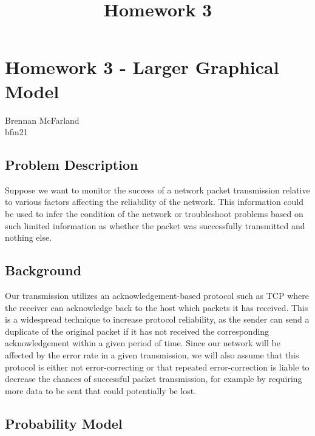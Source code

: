 \documentclass[11pt]{article}
\title{Homework 3}
\begin{document}
    
    
    \maketitle
    
    

    
    \hypertarget{homework-3---larger-graphical-model}{%
\section{Homework 3 - Larger Graphical
Model}\label{homework-3---larger-graphical-model}}

    Brennan McFarland\\
bfm21

    \hypertarget{problem-description}{%
\subsection{Problem Description}\label{problem-description}}

    Suppose we want to monitor the success of a network packet transmission
relative to various factors affecting the reliability of the network.
This information could be used to infer the condition of the network or
troubleshoot problems based on such limited information as whether the
packet was successfully transmitted and nothing else.

    \hypertarget{background}{%
\subsection{Background}\label{background}}

    Our transmission utilizes an acknowledgement-based protocol such as TCP
where the receiver can acknowledge back to the host which packets it has
received. This is a widespread technique to increase protocol
reliability, as the sender can send a duplicate of the original packet
if it has not received the corresponding acknowledgement within a given
period of time. Since our network will be affected by the error rate in
a given transmission, we will also assume that this protocol is either
not error-correcting or that repeated error-correction is liable to
decrease the chances of successful packet transmission, for example by
requiring more data to be sent that could potentially be lost.

    \hypertarget{probability-model}{%
\subsection{Probability Model}\label{probability-model}}
\end{document}
